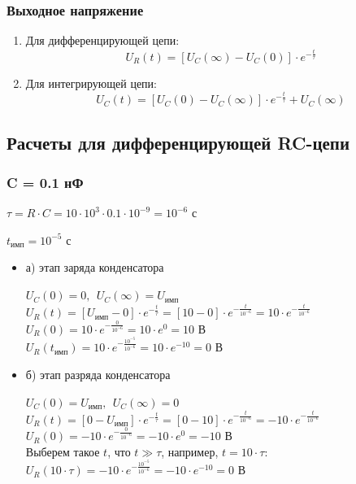 \documentclass[a4paper,14pt]{extarticle}
\begin{document}
\subsubsection{Выходное напряжение}

\begin{enumerate}
	\item Для дифференцирующей цепи:
	\begin{equation}\label{eq:u_r}
		U_R(t) = [U_C(\infty) - U_C(0)] \cdot e^{-\frac{t}{\tau}}
	\end{equation}
	
	\item Для интегрирующей цепи:
	\begin{equation}\label{eq:u_c}
		U_C(t) = [U_C(0) - U_C(\infty)] \cdot e^{-\frac{t}{\tau}} + U_C(\infty)
	\end{equation}
\end{enumerate}

\subsection{Расчеты для дифференцирующей RC-цепи}

\subsubsection{C = 0.1 нФ}

$\tau = R \cdot C = 10 \cdot 10^3 \cdot 0.1 \cdot 10^{-9} = 10^{-6} \text{ с}$

$t_\text{имп} = 10^{-5} \text{ с}$
		
\begin{itemize}
	\item[] а) этап заряда конденсатора

	$U_C(0)	= 0,\ \ U_C(\infty) = U_\text{имп}$\\
	$U_R(t) = [U_\text{имп} - 0] \cdot e^{-\frac{t}{\tau}} = [10 - 0] \cdot e^{-\frac{t}{10^{-6}}} = 10 \cdot e^{-\frac{t}{10^{-6}}}$\\
	$U_R(0) = 10 \cdot e^{-\frac{0}{10^{-6}}} = 10 \cdot e^0 = 10 \text{ В}$\\
	$U_R(t_\text{имп}) = 10 \cdot e^{-\frac{10^{-5}}{10^{-6}}} = 10 \cdot e^{-10} = 0 \text{ В}$

	\item[] б) этап разряда конденсатора
		
	$U_C(0)	= U_\text{имп},\ \ U_C(\infty) = 0$\\		
	$U_R(t) = [0 - U_\text{имп}] \cdot e^{-\frac{t}{\tau}} = [0 - 10] \cdot e^{-\frac{t}{10^{-6}}} = -10 \cdot e^{-\frac{t}{10^{-6}}}$\\
	$U_R(0) = -10 \cdot e^{-\frac{0}{10^{-6}}} = -10 \cdot e^0 = -10 \text{ В}$\\
	Выберем такое $t$, что $t \gg \tau$, например, $t = 10 \cdot \tau$:\\
	$U_R(10 \cdot \tau) = -10 \cdot e^{-\frac{10^{-5}}{10^{-6}}} = -10 \cdot e^{-10} = 0 \text{ В}$	
\end{itemize}
\end{document}
